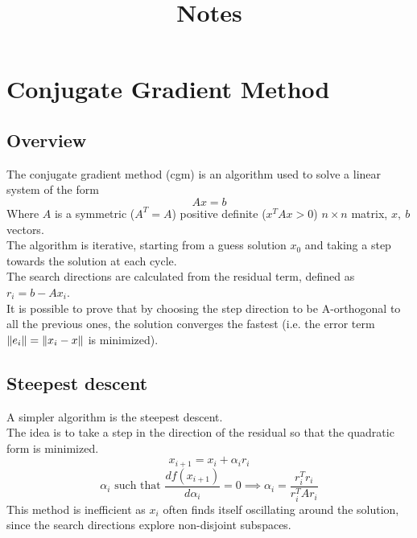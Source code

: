 \documentclass{article}
\title{Notes}
\date{}
\begin{document}
\maketitle
\tableofcontents
\section{Conjugate Gradient Method}
\subsection{Overview}
The conjugate gradient method (cgm) is an algorithm used to solve a linear system of the form
\begin{equation}
    Ax = b
\end{equation}
Where $A$ is a symmetric ($A^T=A$) positive definite ($x^TAx>0$) $n\times n$ matrix, $x,\ b$ vectors.
\\The algorithm is iterative, starting from a guess solution $x_0$ and taking a step towards the solution at each cycle.
\\The search directions are calculated from the residual term, defined as $r_i=b - Ax_i$. 
\\It is possible to prove that by choosing the step direction to be A-orthogonal to all the previous ones, the solution converges the fastest (i.e. the error term $\norm{e_i}=\norm{x_i-x}$ is minimized).
\subsection{Steepest descent}
A simpler algorithm is the steepest descent.
\\The idea is to take a step in the direction of the residual so that the quadratic form is minimized.
\begin{equation}
    x_{i+1} = x_i + \alpha_i r_i 
\end{equation}
\begin{equation}
    \alpha_i \text{ such that } \frac{d f(x_{i+1})}{d\alpha_i} = 0 \implies \alpha_i = \frac{r_i^T r_i}{r_i^T A r_i}
\end{equation}
This method is inefficient as $x_i$ often finds itself oscillating around the solution, since the search directions explore non-disjoint subspaces.
\end{document}
